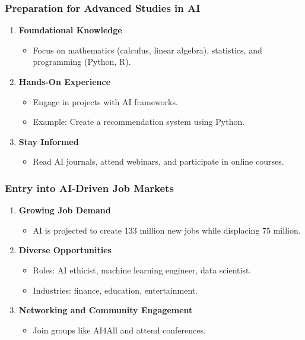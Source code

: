 \documentclass{beamer}
\begin{document}
\begin{frame}[fragile]
    \frametitle{Preparation for Advanced Studies in AI}
    \begin{enumerate}
        \item \textbf{Foundational Knowledge}
            \begin{itemize}
                \item Focus on mathematics (calculus, linear algebra), statistics, and programming (Python, R).
            \end{itemize}
        
        \item \textbf{Hands-On Experience}
            \begin{itemize}
                \item Engage in projects with AI frameworks.
                \item Example: Create a recommendation system using Python.
            \end{itemize}
        
        \item \textbf{Stay Informed}
            \begin{itemize}
                \item Read AI journals, attend webinars, and participate in online courses.
            \end{itemize}
    \end{enumerate}
\end{frame}

\begin{frame}[fragile]
    \frametitle{Entry into AI-Driven Job Markets}
    \begin{enumerate}
        \item \textbf{Growing Job Demand}
            \begin{itemize}
                \item AI is projected to create 133 million new jobs while displacing 75 million.
            \end{itemize}
        
        \item \textbf{Diverse Opportunities}
            \begin{itemize}
                \item Roles: AI ethicist, machine learning engineer, data scientist.
                \item Industries: finance, education, entertainment.
            \end{itemize}
        
        \item \textbf{Networking and Community Engagement}
            \begin{itemize}
                \item Join groups like AI4All and attend conferences.
            \end{itemize}
    \end{enumerate}
\end{frame}
\end{document}
